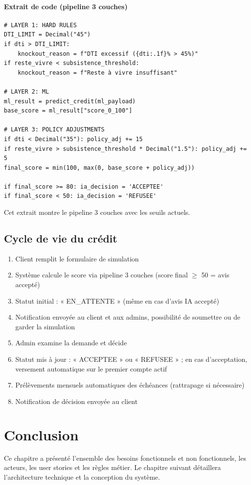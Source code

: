 \documentclass[12pt,a4paper]{report}
\begin{document}
\paragraph{Extrait de code (pipeline 3 couches)} 
\begin{verbatim}
# LAYER 1: HARD RULES
DTI_LIMIT = Decimal("45")
if dti > DTI_LIMIT:
    knockout_reason = f"DTI excessif ({dti:.1f}% > 45%)"
if reste_vivre < subsistence_threshold:
    knockout_reason = f"Reste à vivre insuffisant"

# LAYER 2: ML
ml_result = predict_credit(ml_payload)
base_score = ml_result["score_0_100"]

# LAYER 3: POLICY ADJUSTMENTS
if dti < Decimal("35"): policy_adj += 15
if reste_vivre > subsistence_threshold * Decimal("1.5"): policy_adj += 5
final_score = min(100, max(0, base_score + policy_adj))

if final_score >= 80: ia_decision = 'ACCEPTEE'
if final_score < 50: ia_decision = 'REFUSEE'
\end{verbatim}
Cet extrait montre le pipeline 3 couches avec les seuils actuels.

\subsection{Cycle de vie du crédit}
\begin{enumerate}
    \item Client remplit le formulaire de simulation
    \item Système calcule le score via pipeline 3 couches (score final $\geq$ 50 = avis accepté)
    \item Statut initial : « EN\_ATTENTE » (même en cas d'avis IA accepté)
    \item Notification envoyée au client et aux admins, possibilité de soumettre ou de garder la simulation
    \item Admin examine la demande et décide
    \item Statut mis à jour : « ACCEPTEE » ou « REFUSEE » ; en cas d'acceptation, versement automatique sur le premier compte actif
    \item Prélèvements mensuels automatiques des échéances (rattrapage si nécessaire)
    \item Notification de décision envoyée au client
\end{enumerate}

\section{Conclusion}
Ce chapitre a présenté l'ensemble des besoins fonctionnels et non fonctionnels, les acteurs, les user stories et les règles métier. Le chapitre suivant détaillera l'architecture technique et la conception du système.
\end{document}
